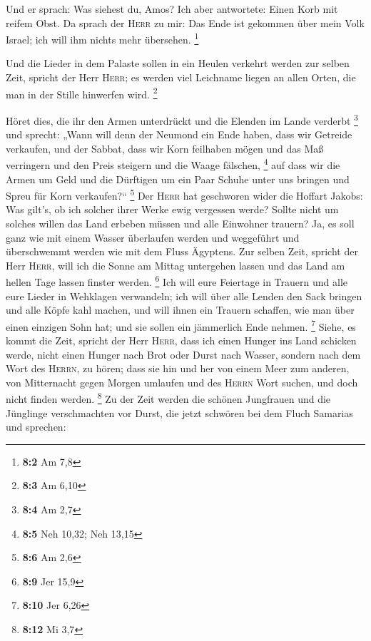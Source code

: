  Und er sprach: Was siehest du, Amos? Ich aber antwortete:
Einen Korb mit reifem Obst. Da sprach der \textsc{Herr} zu mir: Das Ende
ist gekommen über mein Volk Israel; ich will ihm nichts mehr übersehen.
\footnote{\textbf{8:2} Am 7,8}

 Und die Lieder in dem Palaste sollen in ein Heulen
verkehrt werden zur selben Zeit, spricht der Herr \textsc{Herr}; es
werden viel Leichname liegen an allen Orten, die man in der Stille
hinwerfen wird. \footnote{\textbf{8:3} Am 6,10}

 Höret dies, die ihr den Armen unterdrückt und die Elenden
im Lande verderbt \footnote{\textbf{8:4} Am 2,7}  und
sprecht: „Wann will denn der Neumond ein Ende haben, dass wir Getreide
verkaufen, und der Sabbat, dass wir Korn feilhaben mögen und das Maß
verringern und den Preis steigern und die Waage fälschen, \footnote{\textbf{8:5}
  Neh 10,32; Neh 13,15}  auf dass wir die Armen um Geld
und die Dürftigen um ein Paar Schuhe unter uns bringen und Spreu für
Korn verkaufen?{}`` \footnote{\textbf{8:6} Am 2,6}  Der
\textsc{Herr} hat geschworen wider die Hoffart Jakobs: Was gilt's, ob
ich solcher ihrer Werke ewig vergessen werde?  Sollte
nicht um solches willen das Land erbeben müssen und alle Einwohner
trauern? Ja, es soll ganz wie mit einem Wasser überlaufen werden und
weggeführt und überschwemmt werden wie mit dem Fluss Ägyptens.
 Zur selben Zeit, spricht der Herr \textsc{Herr}, will ich
die Sonne am Mittag untergehen lassen und das Land am hellen Tage lassen
finster werden. \footnote{\textbf{8:9} Jer 15,9}  Ich
will eure Feiertage in Trauern und alle eure Lieder in Wehklagen
verwandeln; ich will über alle Lenden den Sack bringen und alle Köpfe
kahl machen, und will ihnen ein Trauern schaffen, wie man über einen
einzigen Sohn hat; und sie sollen ein jämmerlich Ende nehmen.
\footnote{\textbf{8:10} Jer 6,26}  Siehe, es kommt die
Zeit, spricht der Herr \textsc{Herr}, dass ich einen Hunger ins Land
schicken werde, nicht einen Hunger nach Brot oder Durst nach Wasser,
sondern nach dem Wort des \textsc{Herrn}, zu hören;  dass
sie hin und her von einem Meer zum anderen, von Mitternacht gegen Morgen
umlaufen und des \textsc{Herrn} Wort suchen, und doch nicht finden
werden. \footnote{\textbf{8:12} Mi 3,7}  Zu der Zeit
werden die schönen Jungfrauen und die Jünglinge verschmachten vor Durst,
 die jetzt schwören bei dem Fluch Samarias und sprechen:
